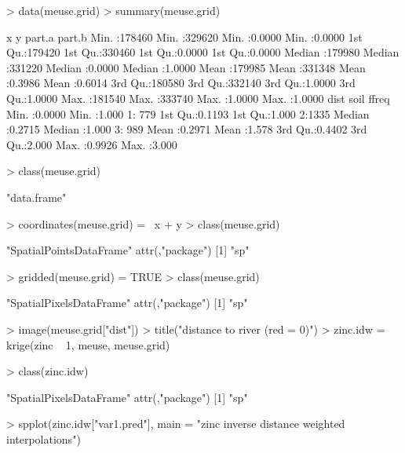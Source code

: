 \documentclass[a4paper]{article}
\begin{document}
\begin{Schunk}
\begin{Sinput}
> data(meuse.grid)
> summary(meuse.grid)
\end{Sinput}
\begin{Soutput}
       x                y              part.a           part.b      
 Min.   :178460   Min.   :329620   Min.   :0.0000   Min.   :0.0000  
 1st Qu.:179420   1st Qu.:330460   1st Qu.:0.0000   1st Qu.:0.0000  
 Median :179980   Median :331220   Median :0.0000   Median :1.0000  
 Mean   :179985   Mean   :331348   Mean   :0.3986   Mean   :0.6014  
 3rd Qu.:180580   3rd Qu.:332140   3rd Qu.:1.0000   3rd Qu.:1.0000  
 Max.   :181540   Max.   :333740   Max.   :1.0000   Max.   :1.0000  
      dist             soil       ffreq   
 Min.   :0.0000   Min.   :1.000   1: 779  
 1st Qu.:0.1193   1st Qu.:1.000   2:1335  
 Median :0.2715   Median :1.000   3: 989  
 Mean   :0.2971   Mean   :1.578           
 3rd Qu.:0.4402   3rd Qu.:2.000           
 Max.   :0.9926   Max.   :3.000           
\end{Soutput}
\begin{Sinput}
> class(meuse.grid)
\end{Sinput}
\begin{Soutput}
[1] "data.frame"
\end{Soutput}
\begin{Sinput}
> coordinates(meuse.grid) = ~x + y
> class(meuse.grid)
\end{Sinput}
\begin{Soutput}
[1] "SpatialPointsDataFrame"
attr(,"package")
[1] "sp"
\end{Soutput}
\begin{Sinput}
> gridded(meuse.grid) = TRUE
> class(meuse.grid)
\end{Sinput}
\begin{Soutput}
[1] "SpatialPixelsDataFrame"
attr(,"package")
[1] "sp"
\end{Soutput}
\begin{Sinput}
> image(meuse.grid["dist"])
> title("distance to river (red = 0)")
> zinc.idw = krige(zinc ~ 1, meuse, meuse.grid)
\end{Sinput}
\begin{Soutput}
\end{Soutput}
\begin{Sinput}
> class(zinc.idw)
\end{Sinput}
\begin{Soutput}
[1] "SpatialPixelsDataFrame"
attr(,"package")
[1] "sp"
\end{Soutput}
\begin{Sinput}
> spplot(zinc.idw["var1.pred"], main = "zinc inverse distance weighted interpolations")
\end{Sinput}
\end{Schunk}
\end{document}
